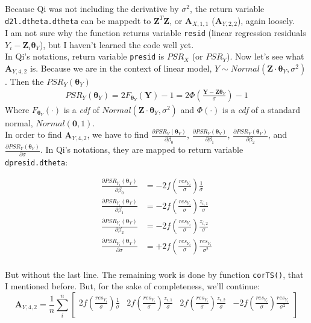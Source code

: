 \documentclass[]{article}
\begin{document}
Because Qi was not including the derivative by $\sigma^2$, the return variable \texttt{d2l.dtheta.dtheta} can be mappedt to  $\pmb{Z}^T\pmb{Z}$, or $\pmb{A}_{X,1,1}$ ($\pmb{A}_{Y,2,2}$), again loosely.\\
I am not sure why the function returns variable \texttt{resid} (linear regression residuals $Y_i - \pmb{Z}_i\pmb{\theta}_Y$), but I haven't learned the code well yet.\\

In Qi's notations, return variable \texttt{presid} is $PSR_X$ (or $PSR_Y$). Now let's see what $\pmb{A}_{Y, 4,2}$ is. Because we are in the context of linear model, $Y \sim Normal(\pmb{Z} \cdot \pmb{\theta}_Y , \sigma^2)$. Then the $PSR_Y(\pmb{\theta}_Y)$
  $$
  \begin{aligned}
    PSR_Y(\pmb{\theta}_Y) = 2F_{\pmb{\theta}_Y}(\pmb{Y}) - 1 = 2 \Phi\left(\frac{\pmb{Y} - \pmb{Z}\pmb{\theta}_Y}{\sigma}\right) - 1
  \end{aligned}
  $$
Where $F_{\pmb{\theta}_Y}(\cdot)$ is a \emph{cdf} of $Normal(\pmb{Z} \cdot \pmb{\theta}_Y , \sigma^2)$ and $\Phi(\cdot)$ is a \emph{cdf} of a standard normal, $Normal(\pmb{0}, 1)$.\\

In order to find $\pmb{A}_{Y, 4,2}$, we have to find  $\frac{\partial PSR_Y(\pmb{\theta}_Y)}{\partial \beta_0}$, $\frac{\partial PSR_Y(\pmb{\theta}_Y)}{\partial \beta_1}$, $\frac{\partial PSR_Y(\pmb{\theta}_Y)}{\partial \beta_2}$, and $ \frac{\partial PSR_Y(\pmb{\theta}_Y)}{\partial \sigma}$. In Qi's notations, they are mapped to return variable \texttt{dpresid.dtheta}:

  $$
  \begin{aligned}
    \frac{\partial PSR_{Y_i}(\pmb{\theta}_Y)}{\partial \beta_0} &= -2f\left(\frac{res_{Y_i}}{\sigma}\right)\frac{1}{\sigma}\\
    \frac{\partial PSR_{Y_i}(\pmb{\theta}_Y)}{\partial \beta_1} &= -2f\left(\frac{res_{Y_i}}{\sigma}\right)\frac{z_{i,1}}{\sigma}\\
    \frac{\partial PSR_{Y_i}(\pmb{\theta}_Y)}{\partial \beta_2} &= -2f\left(\frac{res_{Y_i}}{\sigma}\right)\frac{z_{i,2}}{\sigma}\\
    \frac{\partial PSR_{Y_i}(\pmb{\theta}_Y)}{\partial \sigma} &= +2f\left(\frac{res_{Y_i}}{\sigma}\right)\frac{res_{Y_i}}{\sigma^2}\\
  \end{aligned}
  $$

But without the last line. The remaining work is done by function \texttt{corTS()}, that I mentioned before. But, for the sake of completeness, we'll continue:
\[
\pmb{A}_{Y,4,2} = \frac{1}{n}\sum_i^n\begin{bmatrix}
   2f\left(\frac{res_{Y_i}}{\sigma}\right)\frac{1}{\sigma}   &  2f\left(\frac{res_{Y_i}}{\sigma}\right)\frac{z_{i,1}}{\sigma}   & 2f\left(\frac{res_{Y_i}}{\sigma}\right)\frac{z_{i,2}}{\sigma}  &  -2f\left(\frac{res_{Y_i}}{\sigma}\right)\frac{res_{Y_i}}{\sigma^2}\\
\end{bmatrix}\]
\end{document}
